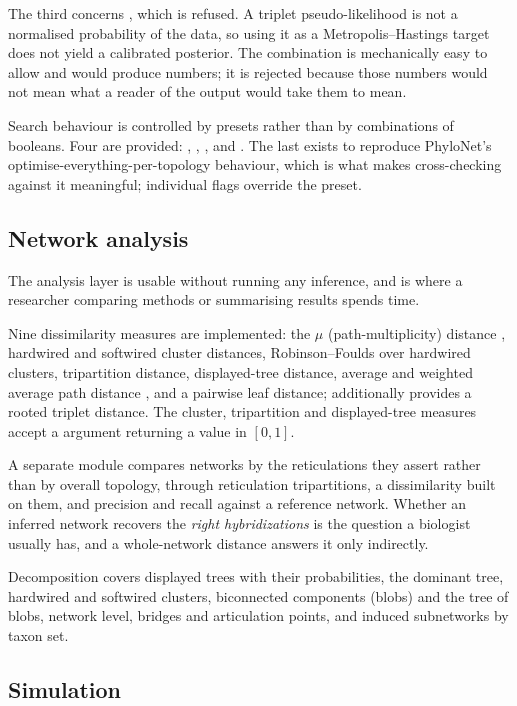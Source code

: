 The third concerns , which is
refused. A triplet pseudo-likelihood is not a normalised probability of the
data, so using it as a Metropolis--Hastings target does not yield a calibrated
posterior. The combination is mechanically easy to allow and would produce
numbers; it is rejected because those numbers would not mean what a reader of
the output would take them to mean.

Search behaviour is controlled by presets rather than by combinations of
booleans. Four are provided: , , , and
. The last exists to reproduce PhyloNet's
optimise-everything-per-topology behaviour, which is what makes cross-checking
against it meaningful; individual flags override the preset.

\subsection{Network analysis}

The analysis layer is usable without running any inference, and is where a
researcher comparing methods or summarising results spends time.

Nine dissimilarity measures are implemented: the $\mu$ (path-multiplicity)
distance \cite{Cardona2009MuDistance}, hardwired and softwired cluster
distances, Robinson--Foulds over hardwired clusters, tripartition distance,
displayed-tree distance, average and weighted average path distance
\cite{TODO_APD}, and a pairwise leaf distance;  additionally
provides a rooted triplet distance. The cluster, tripartition and
displayed-tree measures accept a  argument returning a value in
$[0,1]$.

A separate module compares networks by the reticulations they assert rather
than by overall topology, through reticulation tripartitions, a dissimilarity
built on them, and precision and recall against a reference network. Whether an
inferred network recovers the \emph{right hybridizations} is the question a
biologist usually has, and a whole-network distance answers it only indirectly.

Decomposition covers displayed trees with their probabilities, the dominant
tree, hardwired and softwired clusters, biconnected components (blobs) and the
tree of blobs, network level, bridges and articulation points, and induced
subnetworks by taxon set.

\subsection{Simulation}

